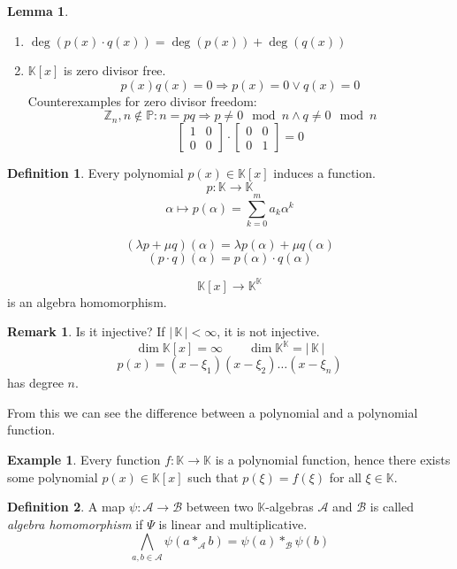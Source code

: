 \documentclass[a4paper,landscape,twocolumn]{article}
\newcommand\abs[1]{|\,#1\,|}
\theoremstyle{definition}
\newtheorem{defi}{Definition}
\newtheorem{ex}{Example}
\newtheorem{rem}{Remark}
\newtheorem{lemma}{Lemma}
\begin{document}
\begin{lemma}
  \begin{enumerate}
    \item $\deg(p(x) \cdot q(x)) = \deg(p(x)) + \deg(q(x))$
    \item $\mathbb K[x]$ is zero divisor free.
      \[ p(x) q(x) = 0 \Rightarrow p(x) = 0 \lor q(x) = 0 \]
      Counterexamples for zero divisor freedom:
      \[ \mathbb Z_n, n \not\in \mathbb P: n = pq \Rightarrow p \neq 0 \mod{n} \land q \neq 0 \mod{n} \]
      \[ \begin{bmatrix} 1 & 0 \\ 0 & 0 \end{bmatrix} \cdot \begin{bmatrix} 0 & 0 \\ 0 & 1 \end{bmatrix} = 0 \]
  \end{enumerate}
\end{lemma}

\begin{defi}
  \label{defi-9.8}
  Every polynomial $p(x) \in \mathbb K[x]$ induces a function.
  \[ p: \mathbb K \to \mathbb K \]
  \[ \alpha \mapsto p(\alpha) = \sum_{k=0}^m a_k \alpha^k \]

  \[ (\lambda p + \mu q)(\alpha) = \lambda p(\alpha) + \mu q(\alpha) \]
  \[ (p \cdot q)(\alpha) = p(\alpha) \cdot q(\alpha) \]

  \[ \mathbb K[x] \to \mathbb K^{\mathbb K} \]
  is an algebra homomorphism.
\end{defi}
\begin{rem}
  Is it injective?
  If $\abs{\mathbb K} < \infty$, it is not injective.
  \[ \dim{\mathbb K[x]} = \infty \qquad \dim{{\mathbb K}^{\mathbb K}} = \abs{\mathbb K} \]
  \[ p(x) = (x - \xi_1)(x - \xi_2) \ldots (x - \xi_n) \]
  has degree $n$.

  From this we can see the difference between a polynomial and a polynomial function.
\end{rem}

\begin{ex}
  Every function $f: \mathbb K \to \mathbb K$ is a polynomial function,
  hence there exists some polynomial $p(x) \in \mathbb K[x]$ such that $p(\xi) = f(\xi)$ for all $\xi \in \mathbb K$.
\end{ex}

\begin{defi}
  \label{defi-9.10}
  A map $\psi: \mathcal A \to \mathcal B$ between two $\mathbb K$-algebras $\mathcal A$ and $\mathcal B$
  is called \emph{algebra homomorphism} if $\Psi$ is linear and multiplicative.
  \[ \bigwedge_{a,b \in \mathcal A} \psi(a *_{\mathcal A} b) = \psi(a) *_{\mathcal B} \psi(b) \]
\end{defi}
\end{document}
